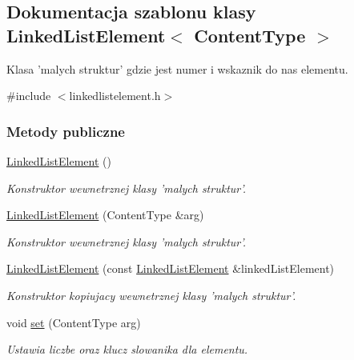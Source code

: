 \hypertarget{class_linked_list_element}{\subsection{Dokumentacja szablonu klasy Linked\-List\-Element$<$ Content\-Type $>$}
\label{class_linked_list_element}
}


Klasa 'malych struktur' gdzie jest numer i wskaznik do nas elementu.  




{\ttfamily \#include $<$linkedlistelement.\-h$>$}

\subsubsection*{Metody publiczne}
\begin{DoxyCompactItemize}
\item 
\hyperlink{class_linked_list_element_af4a4f7bb0adbf66e8147058911e802fc}{Linked\-List\-Element} ()
\begin{DoxyCompactList}\small\item\em Konstruktor wewnetrznej klasy 'malych struktur'. \end{DoxyCompactList}\item 
\hyperlink{class_linked_list_element_acadbc2a5c35fb0fcdae522019c7bd06d}{Linked\-List\-Element} (Content\-Type \&arg)
\begin{DoxyCompactList}\small\item\em Konstruktor wewnetrznej klasy 'malych struktur'. \end{DoxyCompactList}\item 
\hyperlink{class_linked_list_element_a0bcba8520cd0e8b80cdf365ef5b7907b}{Linked\-List\-Element} (const \hyperlink{class_linked_list_element}{Linked\-List\-Element} \&linked\-List\-Element)
\begin{DoxyCompactList}\small\item\em Konstruktor kopiujacy wewnetrznej klasy 'malych struktur'. \end{DoxyCompactList}\item 
void \hyperlink{class_linked_list_element_a715e61c00463afad2486a0b8cb5c7325}{set} (Content\-Type arg)
\begin{DoxyCompactList}\small\item\em Ustawia liczbe oraz klucz slowanika dla elementu. \end{DoxyCompactList}\end{DoxyCompactItemize}
